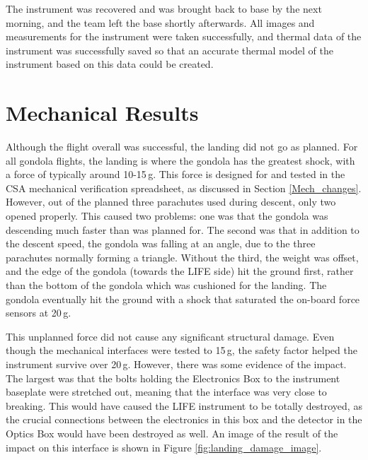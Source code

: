 The instrument was recovered and was brought back to base by the next morning, and the team left the base shortly afterwards. All images and measurements for the instrument were taken successfully, and thermal data of the instrument was successfully saved so that an accurate thermal model of the instrument based on this data could be created.

\section{Mechanical Results}
Although the flight overall was successful, the landing did not go as planned. For all gondola flights, the landing is where the gondola has the greatest shock, with a force of typically around 10-15\,g. This force is designed for and tested in the CSA mechanical verification spreadsheet, as discussed in Section \ref{Mech_changes}. However, out of the planned three parachutes used during descent, only two opened properly. This caused two problems: one was that the gondola was descending much faster than was planned for. The second was that in addition to the descent speed, the gondola was falling at an angle, due to the three parachutes normally forming a triangle. Without the third, the weight was offset, and the edge of the gondola (towards the LIFE side) hit the ground first, rather than the bottom of the gondola which was cushioned for the landing. The gondola eventually hit the ground with a shock that saturated the on-board force sensors at 20\,g.

This unplanned force did not cause any significant structural damage. Even though the mechanical interfaces were tested to 15\,g, the safety factor helped the instrument survive over 20\,g. However, there was some evidence of the impact. The largest was that the bolts holding the Electronics Box to the instrument baseplate were stretched out, meaning that the interface was very close to breaking. This would have caused the LIFE instrument to be totally destroyed, as the crucial connections between the electronics in this box and the detector in the Optics Box would have been destroyed as well. An image of the result of the impact on this interface is shown in Figure \ref{fig:landing_damage_image}.

